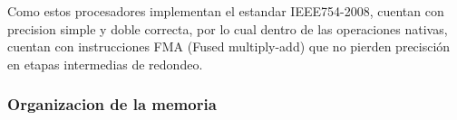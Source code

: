 Como estos procesadores implementan el estandar IEEE754-2008, cuentan con precision simple y
doble correcta, por lo cual dentro de las operaciones nativas, cuentan con instrucciones FMA
(Fused multiply-add) que no pierden precisci\'on en etapas intermedias de redondeo.






\subsubsection{Organizacion de la memoria}

